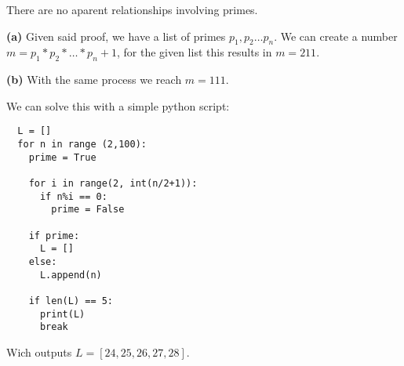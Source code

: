 There are no aparent relationships involving primes.  


\sol \textbf{(a)} Given said proof, we have a list of primes $p_1,p_2 \ldots p_n$.
We can create a number $m = p_1 * p_2 * \ldots * p_n + 1$, for the given list this results in $m = 211$.

\sol \textbf{(b)} With the same process we reach $m = 111$.


\sol 
We can solve this with a simple python script:
\begin{verbatim}
  L = []
  for n in range (2,100):
    prime = True

    for i in range(2, int(n/2+1)):
      if n%i == 0:
        prime = False

    if prime:
      L = []
    else: 
      L.append(n)

    if len(L) == 5:
      print(L)
      break
\end{verbatim}
Wich outputs $L = [24, 25, 26, 27, 28]$.
 
 
